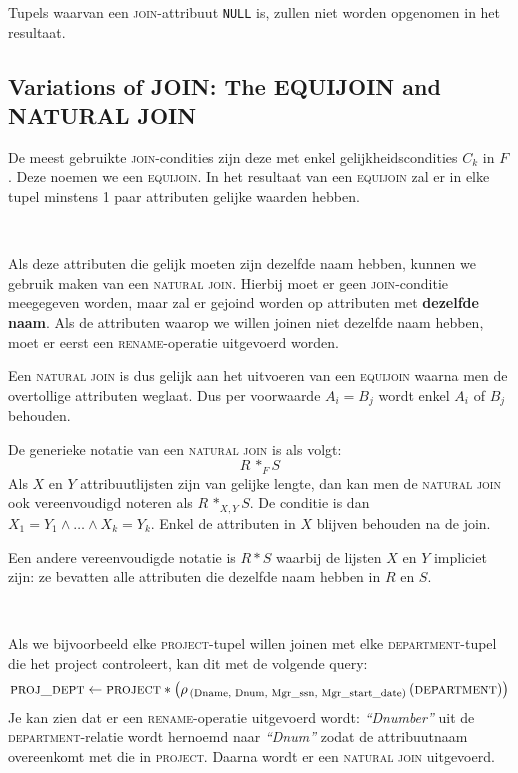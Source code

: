 Tupels waarvan een \textsc{join}-attribuut \texttt{NULL} is, zullen niet worden opgenomen in het resultaat.


\subsection{Variations of JOIN: The EQUIJOIN and NATURAL JOIN}
De meest gebruikte \textsc{join}-condities zijn deze met enkel gelijkheidscondities $C_k$ in $F$. Deze noemen we een \textsc{equijoin}. In het resultaat van een \textsc{equijoin} zal er in elke tupel minstens 1 paar attributen gelijke waarden hebben.

~

\noindent Als deze attributen die gelijk moeten zijn dezelfde naam hebben, kunnen we gebruik maken van een \textsc{natural join}. Hierbij moet er geen \textsc{join}-conditie meegegeven worden, maar zal er gejoind worden op attributen met \textbf{dezelfde naam}. Als de attributen waarop we willen joinen niet dezelfde naam hebben, moet er eerst een \textsc{rename}-operatie uitgevoerd worden.

Een \textsc{natural join} is dus gelijk aan het uitvoeren van een \textsc{equijoin} waarna men de overtollige attributen weglaat. Dus per voorwaarde $A_i = B_j$ wordt enkel $A_i$ of $B_j$ behouden.

De generieke notatie van een \textsc{natural join} is als volgt:
\vspace{-2mm}
\[ R \,*_F S \]
Als $X$ en $Y$ attribuutlijsten zijn van gelijke lengte, dan kan men de \textsc{natural join} ook vereenvoudigd noteren als $R \,*_{X,Y} S$. De conditie is dan $X_1 = Y_1 \wedge \dots \wedge X_k = Y_k$. Enkel de attributen in $X$ blijven behouden na de join.

Een andere vereenvoudigde notatie is $R * S$ waarbij de lijsten $X$ en $Y$ impliciet zijn: ze bevatten alle attributen die dezelfde naam hebben in $R$ en $S$.

~

\noindent Als we bijvoorbeeld elke \textsc{project}-tupel willen joinen met elke \textsc{department}-tupel die het project controleert, kan dit met de volgende query:
\vspace{-2mm}
\[ \textsc{proj\_dept} \leftarrow \textsc{project} * \left(\rho_{\,\text{(Dname, Dnum, Mgr\_ssn, Mgr\_start\_date)}} \left( \textsc{department} \right) \right) \]
Je kan zien dat er een \textsc{rename}-operatie uitgevoerd wordt: \textit{``Dnumber''} uit de \textsc{department}-relatie wordt hernoemd naar \textit{``Dnum''} zodat de attribuutnaam overeenkomt met die in \textsc{project}. Daarna wordt er een \textsc{natural join} uitgevoerd.


